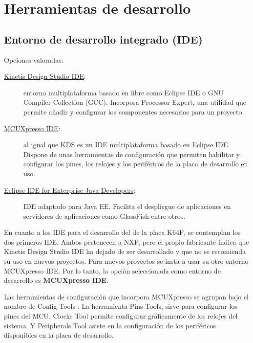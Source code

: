 \section{Herramientas  de desarrollo}
  {\label{sec:herramientas}}

\subsection{Entorno de desarrollo integrado (IDE)}{\label{sec:ide}}
Opciones valoradas:
\begin{description}
  \item[\href{https://www.nxp.com/support/developer-resources/evaluation-and-development-boards/freedom-development-boards/mcu-boards/kinetis-design-studio-integrated-development-environment-ide:KDS_IDE}
  {Kinetis Design Studio IDE}:] entorno multiplataforma basado en
   libre como Eclipse IDE o GNU Compiler Collection
  (GCC). Incorpora Processor Expert, una utilidad que permite añadir y
  configurar los componentes necesarios para un proyecto.
  \item[\href{https://www.nxp.com/support/developer-resources/software-development-tools/mcuxpresso-software-and-tools/mcuxpresso-integrated-development-environment-ide:MCUXpresso-IDE}
  {MCUXpresso IDE}:]al igual que KDS es un IDE multiplataforma basado en Eclipse
  IDE. Dispone de unas herramientas de configuración que permiten habilitar y
  configurar los pines, los relojes y los periféricos de la placa de desarrollo
  en uso.
  \item[\href{https://www.eclipse.org/downloads/packages/release/2018-12/r/eclipse-ide-enterprise-java-developers}
  {Eclipse IDE for Enterprise Java Developers}:] IDE adaptado para Java EE.
  Facilita el despliegue de aplicaciones en servidores de aplicaciones como
  GlassFish entre otros.
\end{description}

En cuanto a los IDE para el desarrollo del  de la placa
K64F, se contemplan los dos primeros IDE. Ambos pertenecen a NXP, pero el propio
fabricante indica que Kinetis Design Studio IDE ha dejado de ser desarrollado y
que no se recomienda su uso en nuevos proyectos. Para nuevos proyectos se insta
a usar su otro entorno MCUXpresso IDE. Por lo tanto, la opción seleccionada como
entorno de desarrollo es \textbf{MCUXpresso IDE}.

Las herramientas de configuración que incorpora MCUXpresso se agrupan bajo el
nombre de Config Tools \cite{webpage:config-tools}. La herramienta Pins Tools,
sirve para configurar los pines del MCU. Clocks Tool permite configurar
gráficamente de los relojes del sistema. Y Peripherals Tool asiste en la
configuración de los periféricos disponibles en la placa de desarrollo.

